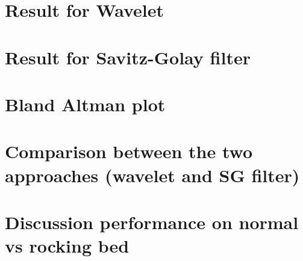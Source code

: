 \section{Result for Wavelet }
\section{Result for Savitz-Golay filter }
\section{Bland Altman plot}
\section{Comparison between the two approaches  (wavelet and SG filter)}
\section{Discussion performance on normal vs rocking bed }


